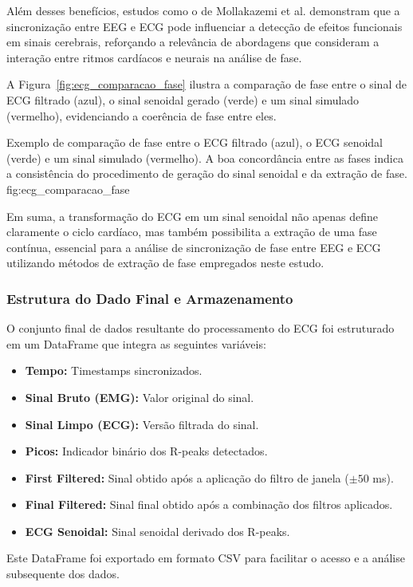 Além desses benefícios, estudos como o de Mollakazemi et al. \cite{mollakazemi2021eeg} demonstram que a sincronização entre EEG e ECG pode influenciar a detecção de efeitos funcionais em sinais cerebrais, reforçando a relevância de abordagens que consideram a interação entre ritmos cardíacos e neurais na análise de fase.

A Figura~\ref{fig:ecg_comparacao_fase} ilustra a comparação de fase entre o sinal de ECG filtrado (azul), o sinal senoidal gerado (verde) e um sinal simulado (vermelho), evidenciando a coerência de fase entre eles.


{Exemplo de comparação de fase entre o ECG filtrado (azul), o ECG senoidal (verde) e um sinal simulado (vermelho). A boa concordância entre as fases indica a consistência do procedimento de geração do sinal senoidal e da extração de fase.}
{fig:ecg_comparacao_fase}


Em suma, a transformação do ECG em um sinal senoidal não apenas define claramente o ciclo cardíaco, mas também possibilita a extração de uma fase contínua, essencial para a análise de sincronização de fase entre EEG e ECG utilizando métodos de extração de fase empregados neste estudo.

\subsubsection{Estrutura do Dado Final e Armazenamento}

O conjunto final de dados resultante do processamento do ECG foi estruturado em um DataFrame que integra as seguintes variáveis:
\begin{itemize}
    \item \textbf{Tempo:} Timestamps sincronizados.
    \item \textbf{Sinal Bruto (EMG):} Valor original do sinal.
    \item \textbf{Sinal Limpo (ECG):} Versão filtrada do sinal.
    \item \textbf{Picos:} Indicador binário dos R-peaks detectados.
    \item \textbf{First Filtered:} Sinal obtido após a aplicação do filtro de janela (\(\pm50\) ms).
    \item \textbf{Final Filtered:} Sinal final obtido após a combinação dos filtros aplicados.
    \item \textbf{ECG Senoidal:} Sinal senoidal derivado dos R-peaks.
\end{itemize}

Este DataFrame foi exportado em formato CSV para facilitar o acesso e a análise subsequente dos dados.
